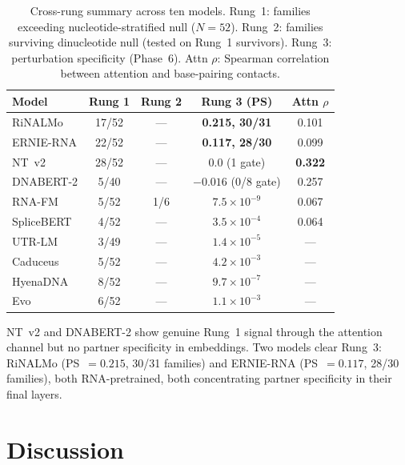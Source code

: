 \documentclass[11pt]{article}
\begin{document}
\begin{table}[ht]
\centering
\caption{Cross-rung summary across ten models.  Rung~1: families
  exceeding nucleotide-stratified null ($N = 52$).  Rung~2: families
  surviving dinucleotide null (tested on Rung~1 survivors).
  Rung~3: perturbation specificity (Phase~6).  Attn $\rho$: Spearman
  correlation between attention and base-pairing contacts.}
\label{tab:crossrung}
\begin{tabular}{lcccc}
\toprule
Model & Rung 1 & Rung 2 & Rung 3 (PS) & Attn $\rho$ \\
\midrule
RiNALMo     & 17/52 & --- & \textbf{0.215, 30/31} & 0.101 \\
ERNIE-RNA   & 22/52 & --- & \textbf{0.117, 28/30} & 0.099 \\
NT~v2       & 28/52 & --- & 0.0 (1 gate) & \textbf{0.322} \\
DNABERT-2   & 5/40  & --- & $-0.016$ (0/8 gate) & 0.257 \\
RNA-FM      & 5/52  & 1/6 & $7.5 \times 10^{-9}$ & 0.067 \\
SpliceBERT  & 4/52  & --- & $3.5 \times 10^{-4}$ & 0.064 \\
UTR-LM      & 3/49  & --- & $1.4 \times 10^{-5}$ & --- \\
Caduceus    & 5/52  & --- & $4.2 \times 10^{-3}$ & --- \\
HyenaDNA    & 8/52  & --- & $9.7 \times 10^{-7}$ & --- \\
Evo         & 6/52  & --- & $1.1 \times 10^{-3}$ & --- \\
\bottomrule
\end{tabular}
\end{table}

NT~v2 and DNABERT-2 show genuine Rung~1 signal through the attention
channel but no partner specificity in embeddings.  Two models clear
Rung~3: RiNALMo (PS~$= 0.215$, 30/31 families) and ERNIE-RNA
(PS~$= 0.117$, 28/30 families), both RNA-pretrained, both
concentrating partner specificity in their final layers.


\section{Discussion}
\label{sec:discussion}
\end{document}
